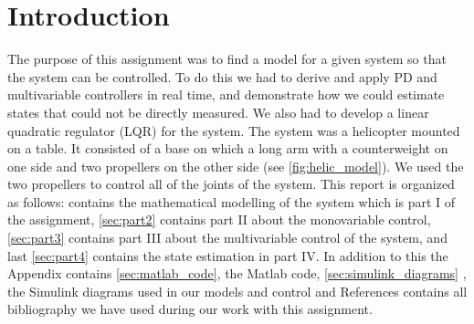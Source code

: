
\section*{Introduction}
The purpose of this assignment was to find a model for a given system so that the system can be controlled. To do this we had to derive and apply PD and multivariable controllers in real time, and demonstrate how we could estimate states that could not be directly measured. We also had to develop a linear quadratic regulator (LQR) for the system.
\newline\newline
The system was a helicopter mounted on a table. It consisted of a base on which a long arm with a counterweight on one side and two propellers on the other side (see \cref{fig:helic_model}). We used the two propellers to control all of the joints of the system.
\newline\newline
This report is organized as follows:  contains the mathematical modelling of the system which is part I of the assignment, \cref{sec:part2} contains part II about the monovariable control, \cref{sec:part3} contains part III about the multivariable control of the system, and last \cref{sec:part4} contains the state estimation in part IV. In addition to this the Appendix contains \cref{sec:matlab_code}, the Matlab code, \cref{sec:simulink_diagrams} , the Simulink diagrams used in our models and control and References contains all bibliography we have used during our work with this assignment. 

